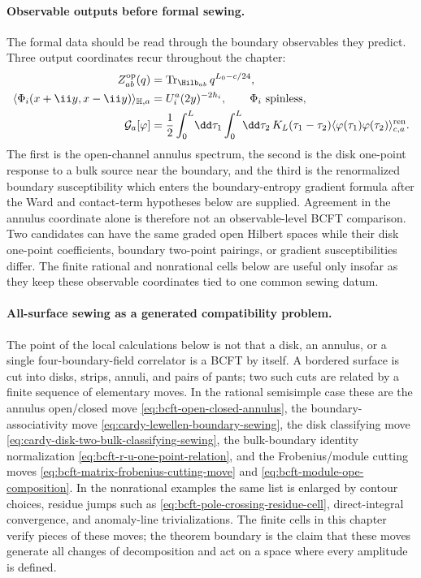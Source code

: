 \paragraph{Observable outputs before formal sewing.}
The formal data should be read through the boundary observables they predict.
Three output coordinates recur throughout the chapter:
\begin{equation}
\begin{aligned}
  Z_{ab}^{\rm op}(q)
  &=
  \operatorname{Tr}_{\Hilb_{ab}}q^{L_0-c/24},                         \\
  \langle\Phi_i(x+\ii y,x-\ii y)\rangle_{\mathbb H,a}
  &=
  U_i^a(2y)^{-2h_i},
  \qquad \Phi_i\ \hbox{spinless},                                      \\
  \mathcal G_a[\varphi]
  &=
  \frac12
  \int_0^L\!\dd\tau_1
  \int_0^L\!\dd\tau_2\,
  K_L(\tau_1-\tau_2)
  \langle\varphi(\tau_1)\varphi(\tau_2)\rangle^{\rm ren}_{c,a}.
\end{aligned}
  \label{eq:bcft-observable-output-coordinates}
\end{equation}
The first is the open-channel annulus spectrum, the second is the disk
one-point response to a bulk source near the boundary, and the third is the
renormalized boundary susceptibility which enters the boundary-entropy
gradient formula after the Ward and contact-term hypotheses below are supplied.
Agreement in the annulus coordinate alone is therefore not an observable-level
BCFT comparison.  Two candidates can have the same graded open Hilbert spaces
while their disk one-point coefficients, boundary two-point pairings, or
gradient susceptibilities differ.  The finite rational and nonrational cells
below are useful only insofar as they keep these observable coordinates tied to
one common sewing datum.

\paragraph{All-surface sewing as a generated compatibility problem.}
The point of the local calculations below is not that a disk, an annulus, or a
single four-boundary-field correlator is a BCFT by itself.  A bordered surface
is cut into disks, strips, annuli, and pairs of pants; two such cuts are
related by a finite sequence of elementary moves.  In the rational
semisimple case these are the annulus open/closed move
\eqref{eq:bcft-open-closed-annulus}, the boundary-associativity move
\eqref{eq:cardy-lewellen-boundary-sewing}, the disk classifying move
\eqref{eq:cardy-disk-two-bulk-classifying-sewing}, the bulk-boundary identity
normalization \eqref{eq:bcft-r-u-one-point-relation}, and the Frobenius/module
cutting moves
\eqref{eq:bcft-matrix-frobenius-cutting-move} and
\eqref{eq:bcft-module-ope-composition}.  In the nonrational examples the same
list is enlarged by contour choices, residue jumps such as
\eqref{eq:bcft-pole-crossing-residue-cell}, direct-integral convergence, and
anomaly-line trivializations.  The finite cells in this chapter verify pieces
of these moves; the theorem boundary is the claim that these moves generate
all changes of decomposition and act on a space where every amplitude is
defined.

